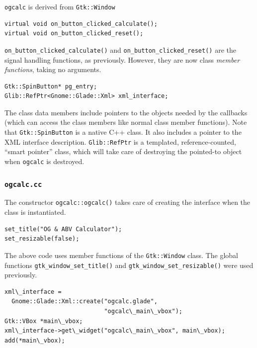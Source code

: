 \documentclass[a4paper,oneside]{article}
\newcommand{\filename}[1]{\texttt{#1}}
\newcommand{\class}[1]{\texttt{#1}}
\newcommand{\function}[1]{\texttt{#1()}}
\begin{document}
\class{ogcalc} is derived from \class{Gtk::Window}

\begin{lstlisting}[numbers=none, language={[GNU]C++}]
virtual void on_button_clicked_calculate();
virtual void on_button_clicked_reset();
\end{lstlisting}

\function{on\_button\_clicked\_calculate} and
\function{on\_button\_clicked\_reset} are the signal handling
functions, as previously.  However, they are now class \emph{member
  functions}, taking no arguments.

\begin{lstlisting}[numbers=none, language={[GNU]C++}]
Gtk::SpinButton* pg_entry;
Glib::RefPtr<Gnome::Glade::Xml> xml_interface;
\end{lstlisting}

The class data members include pointers to the objects needed by the
callbacks (which can access the class members like normal class member
functions).  Note that \class{Gtk::SpinButton} is a native C++ class.
It also includes a pointer to the XML interface description.
\class{Glib::RefPtr} is a templated, reference-counted, ``smart
pointer'' class, which will take care of destroying the pointed-to
object when \class{ogcalc} is destroyed.

\subsubsection{\filename{ogcalc.cc}}

The constructor \function{ogcalc::ogcalc} takes care of creating the
interface when the class is instantiated.

\begin{lstlisting}[numbers=none, language={[GNU]C++}]
set_title("OG & ABV Calculator");
set_resizable(false);
\end{lstlisting}

The above code uses member functions of the \class{Gtk::Window} class.
The global functions \function{gtk\_window\_set\_title} and
\function{gtk\_window\_set\_resizable} were used previously.

\begin{lstlisting}[numbers=none, language={[GNU]C++}]
xml\_interface =
  Gnome::Glade::Xml::create("ogcalc.glade",
                            "ogcalc\_main\_vbox");
Gtk::VBox *main\_vbox;
xml\_interface->get\_widget("ogcalc\_main\_vbox", main\_vbox);
add(*main\_vbox);
\end{lstlisting}
\end{document}
